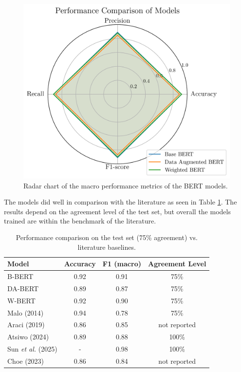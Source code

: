 \documentclass[conference]{IEEEtran}
\begin{document}
\begin{figure}[H]
    \centering
    \includegraphics[width=1\linewidth]{assets/results_radarchart.png}
    \caption{Radar chart of the macro performance metrics of the BERT models.}
    \label{fig:results_radarchart}
\end{figure}


The models did well in comparison with the literature as seen in Table \ref{results_table}. The results depend on the agreement level of the test set, but overall the models trained are within the benchmark of the literature.

\begin{table}[H]
\centering
\caption{Performance comparison on the test set (75\% agreement) vs. literature baselines.}
\label{results_table}
\begin{tabular}{lccc}
\toprule
\textbf{Model} & \textbf{Accuracy} & \textbf{F1 (macro)} & \textbf{Agreement Level} \\
\midrule
B-BERT & 0.92 & 0.91 & 75\% \\
DA-BERT & 0.89 & 0.87 & 75\% \\
W-BERT & 0.92 & 0.90 & 75\% \\
Malo (2014) & 0.94 & 0.78 & 75\% \\
Araci (2019) & 0.86 & 0.85 & not reported \\
Atsiwo (2024) & 0.89 & 0.88 & 100\% \\
Sun \textit{et al.} (2025) & - & 0.98 & 100\% \\
Choe (2023) & 0.86 & 0.84 & not reported \\
\bottomrule
\end{tabular}
\end{table}
\end{document}
